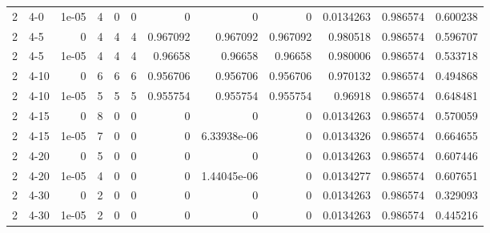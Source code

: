 \begin{tabular}{rlrrrrrrrrrr}
     2 & 4-0    &      1e-05 &           4 &                 0 &                 0 &     0           &     0           &      0           &        0.0134263 &               0.986574 &           0.600238 \\
     2 & 4-5    &      0     &           4 &                 4 &                 4 &     0.967092    &     0.967092    &      0.967092    &        0.980518  &               0.986574 &           0.596707 \\
     2 & 4-5    &      1e-05 &           4 &                 4 &                 4 &     0.96658     &     0.96658     &      0.96658     &        0.980006  &               0.986574 &           0.533718 \\
     2 & 4-10   &      0     &           6 &                 6 &                 6 &     0.956706    &     0.956706    &      0.956706    &        0.970132  &               0.986574 &           0.494868 \\
     2 & 4-10   &      1e-05 &           5 &                 5 &                 5 &     0.955754    &     0.955754    &      0.955754    &        0.96918   &               0.986574 &           0.648481 \\
     2 & 4-15   &      0     &           8 &                 0 &                 0 &     0           &     0           &      0           &        0.0134263 &               0.986574 &           0.570059 \\
     2 & 4-15   &      1e-05 &           7 &                 0 &                 0 &     0           &     6.33938e-06 &      0           &        0.0134326 &               0.986574 &           0.664655 \\
     2 & 4-20   &      0     &           5 &                 0 &                 0 &     0           &     0           &      0           &        0.0134263 &               0.986574 &           0.607446 \\
     2 & 4-20   &      1e-05 &           4 &                 0 &                 0 &     0           &     1.44045e-06 &      0           &        0.0134277 &               0.986574 &           0.607651 \\
     2 & 4-30   &      0     &           2 &                 0 &                 0 &     0           &     0           &      0           &        0.0134263 &               0.986574 &           0.329093 \\
     2 & 4-30   &      1e-05 &           2 &                 0 &                 0 &     0           &     0           &      0           &        0.0134263 &               0.986574 &           0.445216 \\

\end{tabular}
